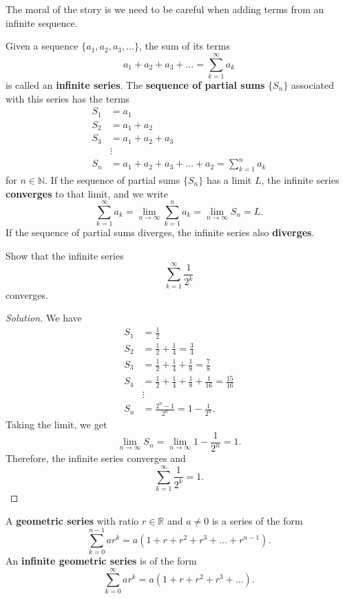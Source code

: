 \documentclass[compacto,10pt,comentarios]{aleph-notas}
\begin{document}
The moral of the story is we need to be careful when adding terms from an infinite sequence.
\begin{defi}
    Given a sequence $\{a_1, a_2, a_3, \ldots \}$, the sum of its terms
    $$
        a_1+a_2+a_3+\ldots = \sum_{k=1}^{\infty} a_k
    $$
    is called an \textbf{infinite series}. The \textbf{sequence of partial sums} $\{S_n\}$ associated with this series has the terms
    \begin{align*}
        S_1 & = a_1 \\
        S_2 & = a_1 + a _2 \\
        S_3 & = a_1 + a_2 + a_3 \\
        & \vdots \\
        S_n & = a_1 + a_2 + a_3 + \ldots + a_2 = \sum_{k=1}^{n} a_k
    \end{align*}
    for $n \in \mathbb{N}$. If the sequence of partial sums $\{S_n\}$ has a limit $L$, the infinite series \textbf{converges} to that limit, and we write
    $$
        \sum_{k=1}^{\infty} a_k = \lim_{n \to \infty} \sum_{k=1}^{n} a_k = \lim_{n \to \infty} S_n = L.
    $$
    If the sequence of partial sums diverges, the infinite series also \textbf{diverges}.
\end{defi}
\begin{ejer}
    Show that the infinite series 
    $$
        \sum_{k=1}^\infty \frac{1}{2^k}
    $$ converges.
\end{ejer}
\begin{proof}[Solution]
    We have
    \begin{align*}
        S_1 & = \frac{1}{2} \\
        S_2 & = \frac{1}{2} + \frac{1}{4} = \frac{3}{4} \\
        S_3 & = \frac{1}{2} + \frac{1}{4} + \frac{1}{8}  = \frac{7}{8} \\
        S_4 & = \frac{1}{2} + \frac{1}{4} + \frac{1}{8} + \frac{1}{16} = \frac{15}{16} \\
        & \vdots \\
        S_n & = \frac{2^{n} - 1}{2^{n}} = 1 - \frac{1}{2^{n}}.
    \end{align*}
    Taking the limit, we get
    $$
        \lim_{n \to \infty} S_n = \lim_{n \to \infty} 1 - \frac{1}{2^{n}} = 1.
    $$
    Therefore, the infinite series converges and
    $$
        \sum_{k=1}^\infty \frac{1}{2^k} = 1.
    $$
\end{proof}

\begin{defi}
    A \textbf{geometric series} with ratio $r \in \mathbb{R}$ and $a \neq 0$ is a series of the form
    $$
        \sum_{k=0}^{n-1}ar^k = a (1 + r + r^2 + r^3 + \ldots + r^{n-1}).
    $$
    An \textbf{infinite geometric series} is of the form
    $$
        \sum_{k=0}^{\infty}ar^k = a (1 + r + r^2 + r^3 + \ldots ).
    $$
\end{defi}
\end{document}

